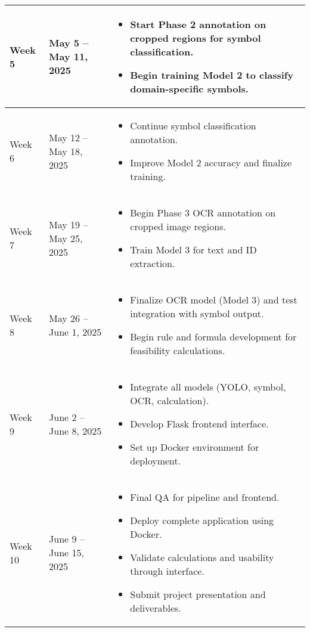 \documentclass{article}
\begin{document}
\begin{longtable}{|p{2.5cm}|p{4.2cm}|p{8.5cm}|}
\hline
Week 5 & May 5 -- May 11, 2025 &
\begin{itemize}
    \item Start Phase 2 annotation on cropped regions for symbol classification.
    \item Begin training Model 2 to classify domain-specific symbols.
\end{itemize} \\
\hline
Week 6 & May 12 -- May 18, 2025 &
\begin{itemize}
    \item Continue symbol classification annotation.
    \item Improve Model 2 accuracy and finalize training.
\end{itemize} \\
\hline
Week 7 & May 19 -- May 25, 2025 &
\begin{itemize}
    \item Begin Phase 3 OCR annotation on cropped image regions.
    \item Train Model 3 for text and ID extraction.
\end{itemize} \\
\hline
Week 8 & May 26 -- June 1, 2025 &
\begin{itemize}
    \item Finalize OCR model (Model 3) and test integration with symbol output.
    \item Begin rule and formula development for feasibility calculations.
\end{itemize} \\
\hline
Week 9 & June 2 -- June 8, 2025 &
\begin{itemize}
    \item Integrate all models (YOLO, symbol, OCR, calculation).
    \item Develop Flask frontend interface.
    \item Set up Docker environment for deployment.
\end{itemize} \\
\hline
Week 10 & June 9 -- June 15, 2025 &
\begin{itemize}
    \item Final QA for pipeline and frontend.
    \item Deploy complete application using Docker.
    \item Validate calculations and usability through interface.
    \item Submit project presentation and deliverables.
\end{itemize} \\
\hline
\end{longtable}
\end{document}
